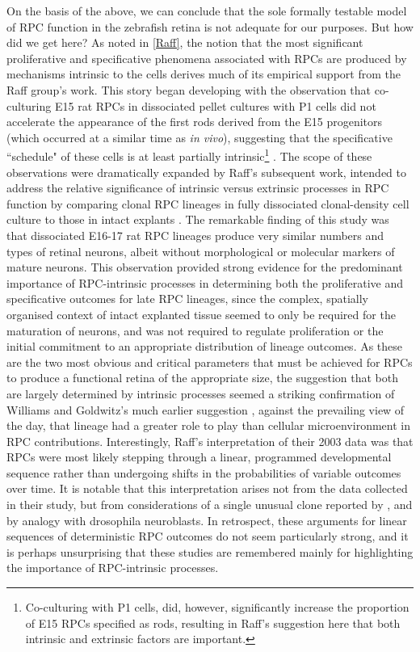 On the basis of the above, we can conclude that the sole formally testable model of RPC function in the zebrafish retina is not adequate for our purposes. But how did we get here? As noted in \autoref{Raff}, the notion that the most significant proliferative and specificative phenomena associated with RPCs are produced by mechanisms intrinsic to the cells derives much of its empirical support from the Raff group's work. This story began developing with the observation that co-culturing E15 rat RPCs in dissociated pellet cultures with P1 cells did not accelerate the appearance of the first rods derived from the E15 progenitors (which occurred at a similar time as \textit{in vivo}), suggesting that the specificative ``schedule" of these cells is at least partially intrinsic\footnote{Co-culturing with P1 cells, did, however, significantly increase the proportion of E15 RPCs specified as rods, resulting in Raff's suggestion here that both intrinsic and extrinsic factors are important.} \cite{Watanabe1990}. The scope of these observations were dramatically expanded by Raff's subsequent work, intended to address the relative significance of intrinsic versus extrinsic processes in RPC function by comparing clonal RPC lineages in fully dissociated clonal-density cell culture to those in intact explants \cite{Cayouette2003}. The remarkable finding of this study was that dissociated E16-17 rat RPC lineages produce very similar numbers and types of retinal neurons, albeit without morphological or molecular markers of mature neurons. This observation provided strong evidence for the predominant importance of RPC-intrinsic processes in determining both the proliferative and specificative outcomes for late RPC lineages, since the complex, spatially organised context of intact explanted tissue seemed to only be required for the maturation of neurons, and was not required to regulate proliferation or the initial commitment to an appropriate distribution of lineage outcomes. As these are the two most obvious and critical parameters that must be achieved for RPCs to produce a functional retina of the appropriate size, the suggestion that both are largely determined by intrinsic processes seemed a striking confirmation of Williams and Goldwitz's much earlier suggestion \cite{Williams1992}, against the prevailing view of the day, that lineage had a greater role to play than cellular microenvironment in RPC contributions. Interestingly, Raff's interpretation of their 2003 data was that RPCs were most likely stepping through a linear, programmed developmental sequence rather than undergoing shifts in the probabilities of variable outcomes over time. It is notable that this interpretation arises not from the data collected in their study, but from considerations of a single unusual clone reported by \cite{Turner1990}, and by analogy with drosophila neuroblasts. In retrospect, these arguments for linear sequences of deterministic RPC outcomes do not seem particularly strong, and it is perhaps unsurprising that these studies are remembered mainly for highlighting the importance of RPC-intrinsic processes.

